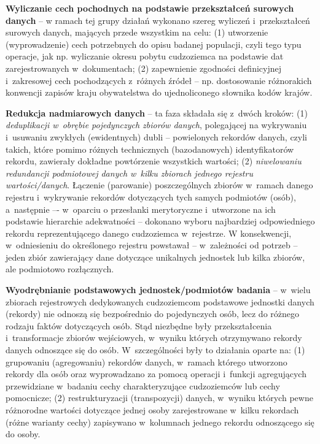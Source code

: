 \documentclass[12pt,a4paper]{article}
\begin{document}
\textbf{Wyliczanie cech pochodnych na podstawie przekształceń surowych danych} -- w ramach tej grupy działań wykonano szereg wyliczeń i~przekształceń surowych danych, mających przede wszystkim na celu: (1) utworzenie (wyprowadzenie) cech potrzebnych do opisu badanej populacji, czyli tego typu operacje, jak np. wyliczanie okresu pobytu cudzoziemca na podstawie dat zarejestrowanych w~dokumentach; (2) zapewnienie zgodności definicyjnej i~zakresowej cech pochodzących z~różnych źródeł -- np. dostosowanie różnorakich konwencji zapisów kraju obywatelstwa do ujednoliconego słownika kodów krajów.

\textbf{Redukcja nadmiarowych danych}  -- ta faza składała się z~dwóch kroków: (1) \textit{deduplikacji w~obrębie pojedynczych zbiorów danych}, polegającej na wykrywaniu i~usuwaniu zwykłych (ewidentnych) dubli – powielonych rekordów danych, czyli takich, które pomimo różnych technicznych (bazodanowych) identyfikatorów rekordu, zawierały dokładne powtórzenie wszystkich wartości; (2) \textit{niwelowaniu redundancji podmiotowej danych w~kilku zbiorach jednego rejestru wartości/danych}. Łączenie (parowanie) poszczególnych zbiorów w~ramach danego rejestru i~wykrywanie rekordów dotyczących tych samych podmiotów (osób), a~następnie –- w~oparciu o przesłanki merytoryczne i~utworzone na ich podstawie hierarchie adekwatności -- dokonano wyboru najbardziej odpowiedniego rekordu reprezentującego danego cudzoziemca w~rejestrze. W konsekwencji, w~odniesieniu do określonego rejestru powstawał -- w~zależności od potrzeb -- jeden zbiór zawierający dane dotyczące unikalnych jednostek lub kilka zbiorów, ale podmiotowo rozłącznych.

\textbf{Wyodrębnianie podstawowych jednostek/podmiotów badania} -- w~wielu zbiorach rejestrowych dedykowanych cudzoziemcom podstawowe jednostki danych (rekordy) nie odnoszą się bezpośrednio do pojedynczych osób, lecz do różnego rodzaju faktów dotyczących osób. Stąd niezbędne były przekształcenia i~transformacje zbiorów wejściowych, w~wyniku których otrzymywano rekordy danych odnoszące się do osób. W~szczególności były to działania oparte na: (1) 	grupowaniu (agregowaniu) rekordów danych, w~ramach którego utworzono rekordy dla osób oraz wyprowadzano za pomocą operacji i~funkcji agregujących przewidziane w~badaniu cechy charakteryzujące cudzoziemców lub cechy pomocnicze; (2)	restrukturyzacji (transpozycji) danych, w~wyniku których pewne różnorodne wartości dotyczące jednej osoby zarejestrowane w~kilku rekordach (różne warianty cechy) zapisywano w~kolumnach jednego rekordu odnoszącego się do osoby.
\end{document}
